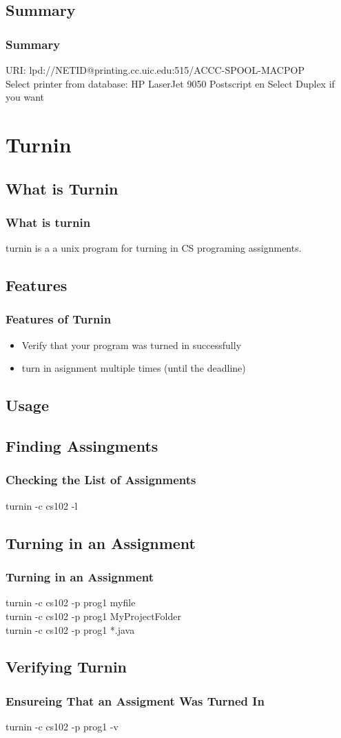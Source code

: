 \documentclass[hyperref={pdfpagelabels=false}]{beamer}
\begin{document}
\subsection{Summary}
\frame
{
    \frametitle{Summary}
URI: lpd://NETID@printing.cc.uic.edu:515/ACCC-SPOOL-MACPOP\\
Select printer from database: HP LaserJet 9050 Postscript en
Select Duplex if you want


}
\section{Turnin}
\subsection{What is Turnin}
\frame
{
    \frametitle{What is turnin}
    turnin is a a unix program for turning in CS programing assignments.
}

\subsection{Features}
\frame
{
    \frametitle{Features of Turnin}
    \begin{itemize}
    \item{Verify that your program was turned in successfully}
    \item{turn in asignment multiple times (until the deadline)}
    \end{itemize}
}
\subsection{Usage}
\subsection{Finding Assingments}
\frame
{
    \frametitle{Checking the List of Assignments}
	turnin -c cs102 -l
}
\subsection{Turning in an Assignment}
\frame
{
    \frametitle{Turning in an Assignment}
	turnin -c cs102 -p prog1 myfile\\
	turnin -c cs102 -p prog1 MyProjectFolder\\
	turnin -c cs102 -p prog1 *.java
}
\subsection{Verifying Turnin}
\frame
{
    \frametitle{Ensureing That an Assigment Was Turned In}
	turnin -c cs102 -p prog1 -v

}
\end{document}

